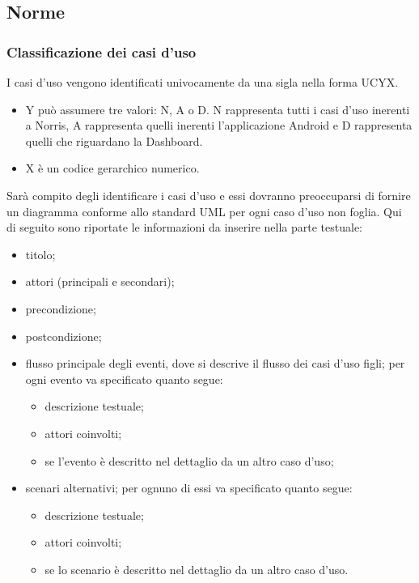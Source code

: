 		\subsection{Norme}
			\subsubsection{Classificazione dei casi d'uso}
				I casi d'uso vengono identificati univocamente da una sigla nella forma UCYX.
				\begin{itemize}
					\item Y può assumere tre valori: N, A o D. N rappresenta tutti i casi d'uso inerenti a Norris, A rappresenta quelli inerenti l'applicazione Android e D rappresenta quelli che riguardano la Dashboard.
					\item X è un codice gerarchico numerico.
				\end{itemize}
				Sarà compito degli  identificare i casi d'uso e essi dovranno preoccuparsi di fornire un diagramma conforme allo standard UML per ogni caso d'uso non foglia. Qui di seguito sono riportate le informazioni da inserire nella parte testuale:
				\begin{itemize}
					\item titolo;
					\item attori (principali e secondari);
					\item precondizione;
					\item postcondizione;
					\item flusso principale degli eventi, dove si descrive il flusso dei casi d'uso figli; per ogni evento va specificato quanto segue:
					\begin{itemize}
						\item descrizione testuale;
						\item attori coinvolti;
						\item se l’evento è descritto nel dettaglio da un altro caso d’uso;
					\end{itemize}
					\item scenari alternativi; per ognuno di essi va specificato quanto segue:
					\begin{itemize}
						\item descrizione testuale;
						\item attori coinvolti;
						\item se lo scenario è descritto nel dettaglio da un altro caso d’uso.
					\end{itemize}
				\end{itemize}
